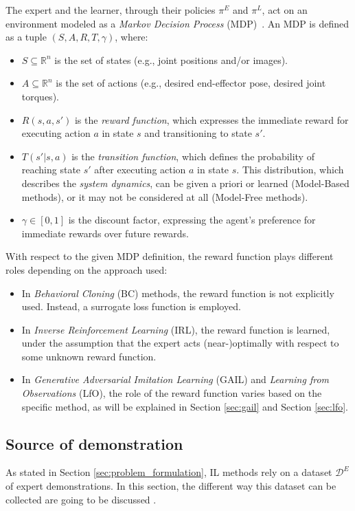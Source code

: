 The expert and the learner, through their policies $\pi^{E}$ and $\pi^{L}$, act on an environment modeled as a \textit{Markov Decision Process} (MDP)~\cite{kroemer2021review_robot_learning}. An MDP is defined as a tuple $(S, A, R, T, \gamma)$, where:
\begin{itemize}
    \item $S \subseteq \mathbb{R}^{n}$ is the set of states (e.g., joint positions and/or images).
    \item $A \subseteq \mathbb{R}^{n}$ is the set of actions (e.g., desired end-effector pose, desired joint torques).
    \item $R(s, a, s')$ is the \textit{reward function}, which expresses the immediate reward for executing action $a$ in state $s$ and transitioning to state $s'$.
    \item $T(s' | s, a)$ is the \textit{transition function}, which defines the probability of reaching state $s'$ after executing action $a$ in state $s$. This distribution, which describes the \textit{system dynamics}, can be given a priori or learned (Model-Based methods), or it may not be considered at all (Model-Free methods).
    \item $\gamma \in [0,1]$ is the discount factor, expressing the agent's preference for immediate rewards over future rewards.
\end{itemize}

With respect to the given MDP definition, the reward function plays different roles depending on the approach used:
\begin{itemize}
    \item In \textit{Behavioral Cloning} (BC) methods, the reward function is not explicitly used. Instead, a surrogate loss function is employed.
    \item In \textit{Inverse Reinforcement Learning} (IRL), the reward function is learned, under the assumption that the expert acts (near-)optimally with respect to some unknown reward function.
    \item In \textit{Generative Adversarial Imitation Learning} (GAIL) and \textit{Learning from Observations} (LfO), the role of the reward function varies based on the specific method, as will be explained in Section \ref{sec:gail} and Section \ref{sec:lfo}.
\end{itemize}



\subsection{Source of demonstration}
\label{sec:sod}
As stated in Section \ref{sec:problem_formulation}, IL methods rely on a dataset $\mathcal{D}^{E}$ of expert demonstrations. In this section, the different way this dataset can be collected are going to be discussed \cite{fang2019survey}.

